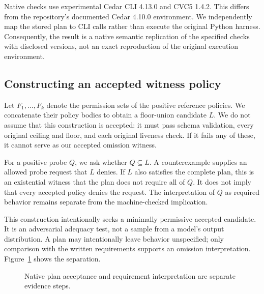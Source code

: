 \documentclass[sigconf,nonacm]{acmart}
\begin{document}
Native checks use experimental Cedar CLI 4.13.0 and CVC5 1.4.2. This differs from the repository's documented Cedar 4.10.0 environment. We independently map the stored plan to CLI calls rather than execute the original Python harness. Consequently, the result is a native semantic replication of the specified checks with disclosed versions, not an exact reproduction of the original execution environment.

\subsection{Constructing an accepted witness policy}
Let $F_1,\ldots,F_k$ denote the permission sets of the positive reference policies. We concatenate their policy bodies to obtain a floor-union candidate $L$. We do not assume that this construction is accepted: it must pass schema validation, every original ceiling and floor, and each original liveness check. If it fails any of these, it cannot serve as our accepted omission witness.

For a positive probe $Q$, we ask whether $Q\subseteq L$. A counterexample supplies an allowed probe request that $L$ denies. If $L$ also satisfies the complete plan, this is an existential witness that the plan does not require all of $Q$. It does not imply that every accepted policy denies the request. The interpretation of $Q$ as required behavior remains separate from the machine-checked implication.

This construction intentionally seeks a minimally permissive accepted candidate. It is an adversarial adequacy test, not a sample from a model's output distribution. A plan may intentionally leave behavior unspecified; only comparison with the written requirements supports an omission interpretation. Figure~\ref{fig:workflow} shows the separation.

\begin{figure}[t]
\centering
{}
\caption{Native plan acceptance and requirement interpretation are separate evidence steps.}
\label{fig:workflow}
\end{figure}
\end{document}
